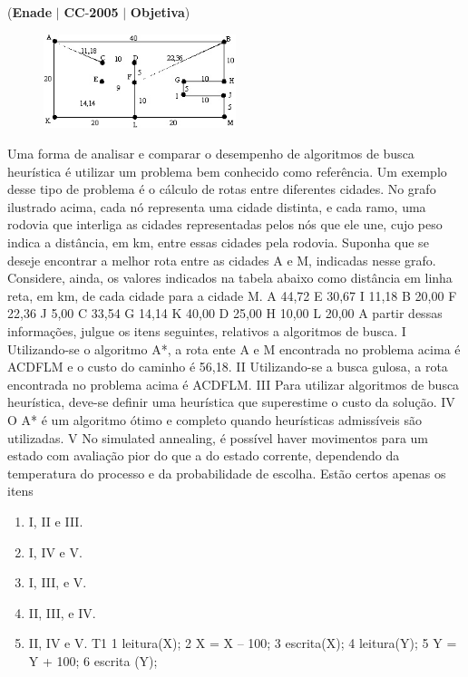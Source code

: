 \documentclass{exam}
\begin{document}
\begin{questions}
\question (\textbf{Enade} $|$ \textbf{CC}-\textbf{2005} $|$ \textbf{Objetiva})

\begin{figure}[H]
	\begin{center}
		\includegraphics[width=0.5\textwidth]{CIENCIA_DA_COMPUTACAO_Prova2005-utf8_figuras/fig-0020.jpg}
	\end{center}
\end{figure}
Uma forma de analisar e comparar o desempenho de algoritmos
de busca heurística é utilizar um problema bem conhecido como
referência. Um exemplo desse tipo de problema é o cálculo de
rotas entre diferentes cidades. No grafo ilustrado acima, cada nó
representa uma cidade distinta, e cada ramo, uma rodovia que
interliga as cidades representadas pelos nós que ele une, cujo peso
indica a distância, em km, entre essas cidades pela rodovia.
Suponha que se deseje encontrar a melhor rota entre as cidades A
e M, indicadas nesse grafo. Considere, ainda, os valores indicados
na tabela abaixo como distância em linha reta, em km, de cada
cidade para a cidade M.
A 44,72 E 30,67 I 11,18
B 20,00 F 22,36 J 5,00
C 33,54 G 14,14 K 40,00
D 25,00 H 10,00 L 20,00
A partir dessas informações, julgue os itens seguintes, relativos a
algoritmos de busca.
I Utilizando-se o algoritmo A*, a rota ente A e M encontrada no
problema acima é ACDFLM e o custo do caminho é 56,18.
II Utilizando-se a busca gulosa, a rota encontrada no problema
acima é ACDFLM.
III Para utilizar algoritmos de busca heurística, deve-se definir
uma heurística que superestime o custo da solução.
IV O A* é um algoritmo ótimo e completo quando heurísticas
admissíveis são utilizadas.
V No simulated annealing, é possível haver movimentos para um
estado com avaliação pior do que a do estado corrente,
dependendo da temperatura do processo e da probabilidade
de escolha.
Estão certos apenas os itens
	\begin{enumerate}[label=\alph*)]
		\item  I, II e III.
		\item  I, IV e V.
		\item  I, III, e V.
		\item  II, III, e IV.
		\item  II, IV e V.
T1
1 leitura(X);
2 X = X – 100;
3 escrita(X);
4 leitura(Y);
5 Y = Y + 100;
6 escrita (Y);
	\end{enumerate}


\end{questions}
\end{document}
